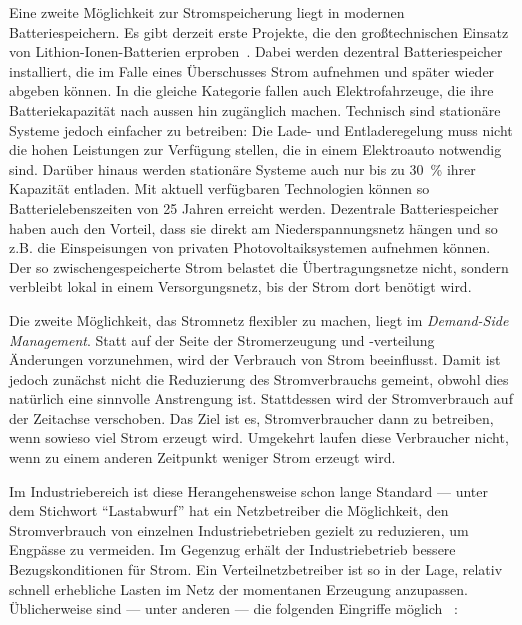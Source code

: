 \documentclass[12pt,BCOR=8.5mm]{scrartcl}
\begin{document}
Eine zweite Möglichkeit zur Stromspeicherung liegt in modernen
Batteriespeichern. Es gibt derzeit erste Projekte, die den
großtechnischen Einsatz von Lithion-Ionen-Batterien
erproben~\cite{braun09lithium}. Dabei werden dezentral Batteriespeicher
installiert, die im Falle eines Überschusses Strom aufnehmen und später
wieder abgeben können. In die gleiche Kategorie fallen auch
Elektrofahrzeuge, die ihre Batteriekapazität nach aussen hin zugänglich
machen. Technisch sind stationäre Systeme jedoch einfacher zu betreiben:
Die Lade- und Entladeregelung muss nicht die hohen Leistungen zur
Verfügung stellen, die in einem Elektroauto notwendig sind. Darüber
hinaus werden stationäre Systeme auch nur bis zu 30~\% ihrer Kapazität
entladen. Mit aktuell verfügbaren Technologien können so
Batterielebenszeiten von 25 Jahren erreicht werden. Dezentrale
Batteriespeicher haben auch den Vorteil, dass sie direkt am
Niederspannungsnetz hängen und so z.B. die Einspeisungen von privaten
Photovoltaiksystemen aufnehmen können. Der so zwischengespeicherte Strom
belastet die Übertragungsnetze nicht, sondern verbleibt lokal in einem
Versorgungsnetz, bis der Strom dort benötigt wird.

Die zweite Möglichkeit, das Stromnetz flexibler zu machen, liegt im \emph{Demand-Side
Management}. Statt auf der Seite der Stromerzeugung und -verteilung
Änderungen vorzunehmen, wird der Verbrauch von Strom beeinflusst. Damit
ist jedoch zunächst nicht die Reduzierung des Stromverbrauchs gemeint,
obwohl dies natürlich eine sinnvolle Anstrengung ist. Stattdessen wird
der Stromverbrauch auf der Zeitachse verschoben. Das Ziel ist es,
Stromverbraucher dann zu betreiben, wenn sowieso viel Strom erzeugt
wird. Umgekehrt laufen diese Verbraucher nicht, wenn zu einem anderen
Zeitpunkt weniger Strom erzeugt wird.

Im Industriebereich ist diese Herangehensweise schon lange Standard ---
unter dem Stichwort "`Lastabwurf"' hat ein Netzbetreiber die
Möglichkeit, den Stromverbrauch von einzelnen Industriebetrieben gezielt
zu reduzieren, um Engpässe zu vermeiden. Im Gegenzug erhält der
Industriebetrieb bessere Bezugskonditionen für Strom. Ein
Verteilnetzbetreiber ist so in der Lage, relativ schnell erhebliche
Lasten im Netz der momentanen Erzeugung anzupassen. Üblicherweise sind
--- unter anderen --- die folgenden Eingriffe möglich \cite[S.
23f]{wiechmann08lastmanagement}~\cite[S. 85ff]{bmwi06eenergy}:
\end{document}
